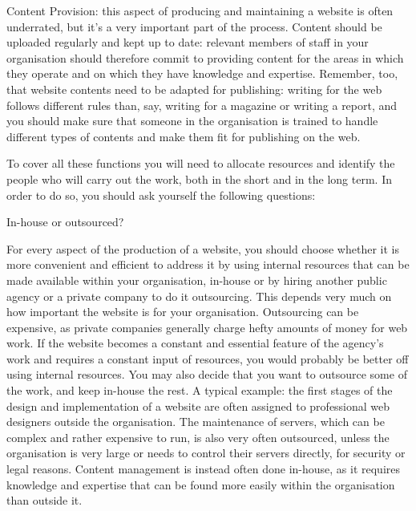 Content Provision: this aspect of producing and maintaining a website is often underrated, but it's a very important part of the process. Content should be uploaded regularly and kept up to date: relevant members of staff in your organisation should therefore commit to providing content for the areas in which they operate and on which they have knowledge and expertise. Remember, too, that website contents need to be adapted for publishing: writing for the web follows different rules than, say, writing for a magazine or writing a report, and you should make sure that someone in the organisation is trained to handle different types of contents and make them fit for publishing on the web.

To cover all these functions you will need to allocate resources and identify the people who will carry out the work, both in the short and in the long term. In order to do so, you should ask yourself the following questions:

In-house or outsourced?

For every aspect of the production of a website, you should choose whether it is more convenient and efficient to address it by using internal resources that can be made available within your organisation, in-house or by hiring another public agency or a private company to do it outsourcing. This depends very much on how important the website is for your organisation. Outsourcing can be expensive, as private companies generally charge hefty amounts of money for web work. If the website becomes a constant and essential feature of the agency's work and requires a constant input of resources, you would probably be better off using internal resources. You may also decide that you want to outsource some of the work, and keep in-house the rest. A typical example: the first stages of the design and implementation of a website are often assigned to professional web designers outside the organisation. The maintenance of servers, which can be complex and rather expensive to run, is also very often outsourced, unless the organisation is very large or needs to control their servers directly, for security or legal reasons. Content management is instead often done in-house, as it requires knowledge and expertise that can be found more easily within the organisation than outside it.

